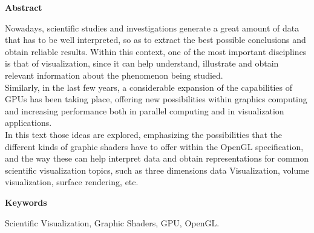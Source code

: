 
\newpage

\thispagestyle{empty}

\begin{center}

{\bf \Huge Abstract}

  \end{center}
\vspace{1cm}

	Nowadays, scientific studies and investigations generate a great amount of
	data that has to be well interpreted, so as to extract the best possible
	conclusions and obtain reliable results. Within this context, one of the
	most important disciplines is that of visualization, since it can help
	understand, illustrate and obtain relevant information about the phenomenon
	being studied.\\

	Similarly, in the last few years, a considerable expansion of the
	capabilities of GPUs has been taking place, offering new possibilities
	within graphics computing and increasing performance both in parallel
	computing and in visualization applications.\\

	In this text those ideas are explored, emphasizing the possibilities that
	the different kinds of graphic shaders  have to offer within the OpenGL
	specification, and the way these can help interpret data and obtain
	representations for common scientific visualization topics, such as three
	dimensions data Visualization, volume visualization, surface rendering, etc.

\vspace{1cm}


\begin{center}

{\bf \Large Keywords}

   \end{center}

   \vspace{0.5cm}
   
	Scientific Visualization, Graphic Shaders, GPU, OpenGL.
   


